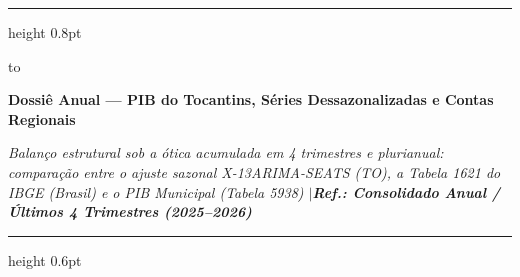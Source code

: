 \documentclass[10pt,a4paper]{article}
\begin{document}
\color{cinzatexto}

%
\par\vspace{2pt}%
{\color{coracento}\hrule height 0.8pt}%
\par\vspace{6pt}%
\noindent\hbox to %
\par\vspace{5pt}%
{\fontsize{14.5}{17.4}\selectfont\bfseries\color{corprimaria}Dossiê Anual — PIB do Tocantins, Séries Dessazonalizadas e Contas Regionais\par}%
\vspace{3pt}%
{\footnotesize\itshape\color{cinzasub}Balanço estrutural sob a ótica acumulada em 4 trimestres e plurianual: comparação entre o ajuste sazonal X-13ARIMA-SEATS (TO), a Tabela 1621 do IBGE (Brasil) e o PIB Municipal (Tabela 5938) \enspace$\vert$\enspace \textbf{\color{corprimaria}Ref.: Consolidado Anual / Últimos 4 Trimestres (2025–2026)}\par}%
\par\vspace{6pt}%
{\color{cinzaborda}\hrule height 0.6pt}%

\vspace{0.12cm}
\end{document}
